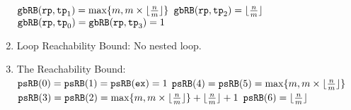 \begin{enumerate}
\\
$\mathtt{gbRB}(\mathtt{rp}, \mathtt{tp}_1) = \max\{m, m \times \lfloor\frac{n}{m}\rfloor\}$ \quad
$\mathtt{gbRB}(\mathtt{rp}, \mathtt{tp}_2) = \lfloor\frac{n}{m}\rfloor$ \quad
$\mathtt{gbRB}(\mathtt{rp}, \mathtt{tp}_0) = \mathtt{gbRB}(\mathtt{rp}, \mathtt{tp}_3) = 1$ 
%
\item Loop Reachability Bound:
No nested loop.
%
%
\item The Reachability Bound:
\\
$\mathtt{psRB}(0) = \mathtt{psRB}(1) = \mathtt{psRB}(\mathtt{ex}) = 1$ \qquad
$\mathtt{psRB}(4) = \mathtt{psRB}(5) = \max\{m, m \times \lfloor\frac{n}{m}\rfloor\}$ 
\\
$\mathtt{psRB}(3) = \mathtt{psRB}(2) = \max\{m, m \times \lfloor\frac{n}{m}\rfloor\} + \lfloor\frac{n}{m}\rfloor + 1 $
\quad $\mathtt{psRB}(6) = \lfloor\frac{n}{m}\rfloor$ 
%
\end{enumerate}